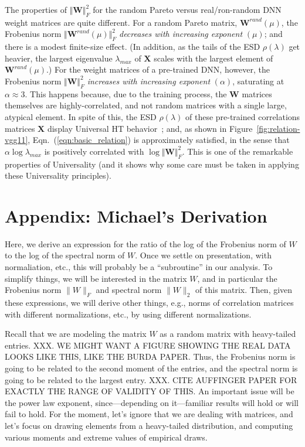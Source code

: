 The properties of $\Vert\mathbf{W}\Vert^{2}_{F}$ for the random Pareto versus real/ron-random DNN weight matrices are quite different.
For a random Pareto matrix, $\mathbf{W}^{rand}(\mu)$, the Frobenius norm $\Vert\mathbf{W}^{rand}(\mu)\Vert^{2}_{F}$ 
\emph{decreases with increasing exponent} $(\mu)$; and there is a modest finite-size effect.
(In addition, as the tails of the ESD $\rho(\lambda)$ get heavier, the largest eigenvalue $\lambda_{max}$ of $\mathbf{X}$ scales with the largest element of $\mathbf{W}^{rand}(\mu)$.) 
For the weight matrices of a pre-trained DNN, however, the Frobenius norm $\Vert\mathbf{W}\Vert^{2}_{F}$ \emph{increases with increasing exponent} $(\alpha)$, saturating at $\alpha\approx 3$.
This happens because, due to the training process, the $\mathbf{W}$ matrices themselves are highly-correlated, and not random matrices with a single large, atypical element.
In spite of this, the ESD $\rho(\lambda)$ of these pre-trained correlations matrices $\mathbf{X}$ display Universal HT behavior~\cite{MM18_TR}; and, as shown in Figure~\ref{fig:relation-vgg11}, 
Eqn.~(\ref{eqn:basic_relation}) is approximately satisfied, in the sense that 
$\alpha\log\lambda_{max}$ is positively correlated with $\log\Vert\mathbf{W}\Vert^{2}_{F} $.
This is one of the remarkable properties of Universality (and it shows why some care must be taken in applying these Universality principles).
 

\section{Appendix: Michael's Derivation}
\label{sxn:appendix-michael_derivation}


Here, we derive an expression for the ratio of the log of the Frobenius norm of $W$ to the log of the spectral norm of $W$.
Once we settle on presentation, with normaliation, etc., this will probably be a ``subroutine'' in our analysis.
To simplify things, we will be interested in the matrix $W$, and in particular the Frobenius norm $\|W\|_F$ and spectral norm $\|W\|_2$ of this matrix.
Then, given these expressions, we will derive other things, e.g., norms of correlation matrices with different normalizations, etc., by using different normalizations.  

Recall that we are modeling the matrix $W$ as a random matrix with heavy-tailed entries.
XXX.  WE MIGHT WANT A FIGURE SHOWING THE REAL DATA LOOKS LIKE THIS, LIKE THE BURDA PAPER.
Thus, the Frobenius norm is going to be related to the second moment of the entries, and the spectral norm is going to be related to the largest entry.
XXX.  CITE AUFFINGER PAPER FOR EXACTLY THE RANGE OF VALIDITY OF THIS.
An important issue will be the power law exponent, since---depending on it---familiar results will hold or will fail to hold.
For the moment, let's ignore that we are dealing with matrices, and let's focus on drawing elements from a heavy-tailed distribution, and computing various moments and extreme values of empirical draws.

